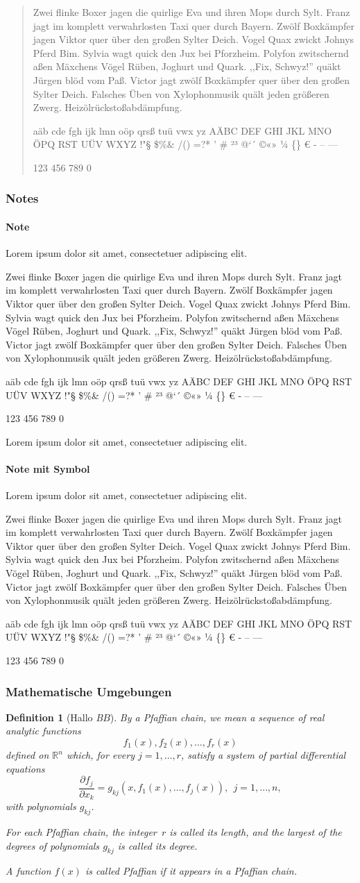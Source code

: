 \documentclass[english,ngerman]{book}%
\makeatletter
\theoremstyle{dgdef}
\newtheorem{definition}{Definition}%
\theoremstyle{dgthm}
\newcommand{\kurzerblindtext}{%
\noindent{}Zwei flinke Boxer jagen die quirlige Eva und ihren Mops durch Sylt. Franz jagt im komplett verwahrlosten Taxi quer durch
  Bayern. Zwölf Boxkämpfer jagen Viktor quer über den großen Sylter Deich. Vogel Quax zwickt Johnys Pferd Bim. Sylvia wagt quick
  den Jux bei Pforzheim. Polyfon zwitschernd aßen Mäxchens Vögel Rüben, Joghurt und Quark. ,,Fix, Schwyz!'' quäkt Jürgen blöd vom
  Paß. Victor jagt zwölf Boxkämpfer quer über den großen Sylter Deich. Falsches Üben von Xylophonmusik quält jeden größeren
  Zwerg. Heizölrückstoßabdämpfung.

  aäb cde fgh ijk lmn oöp qrsß tuü vwx yz AÄBC DEF GHI JKL MNO ÖPQ RST UÜV WXYZ !"§ \$\%\& /() =?* ' \# \symbol{"7E} ²³ @`´ ©«» ¼ \{\} €  - -- ---

  123 456 789 0
}
\makeatother
\begin{document}
\begin{quotation}
   \kurzerblindtext
\end{quotation}




\subsubsection{Notes}

\paragraph{Note}

Lorem ipsum dolor sit amet, consectetuer adipiscing elit.

\begin{note}
  \kurzerblindtext
\end{note}


Lorem ipsum dolor sit amet, consectetuer adipiscing elit.

\paragraph{Note mit Symbol}
Lorem ipsum dolor sit amet, consectetuer adipiscing elit.

\begin{note}[DG_notice]
  \kurzerblindtext
\end{note}

\subsubsection{Mathematische Umgebungen}


\begin{definition}[Hallo \textit{B}$B$]By a \textit{Pfaffian chain}, we mean a sequence of real analytic functions
\begin{equation*}
f_1(x), f_2(x), \dots, f_r(x)
\end{equation*}
 defined on $\mathbb{R}^n$ which, for every $j=1,\dots,r$, satisfy a system of partial differential equations
\begin{equation*}
 \frac{\partial f_j}{\partial x_k}= g_{kj}(x, f_1(x), \dots, f_j(x)),\ \ j=1,\dots,n,
\end{equation*}
 with polynomials $g_{kj}$. \item For each Pfaffian chain, the integer~$r$ is called its \textit{length}, and the largest of the degrees of polynomials $g_{kj}$ is called its \textit{degree}.
\item A function $f(x)$ is called \textit{Pfaffian} if it appears in a Pfaffian chain.
\end{definition}
\end{document}
